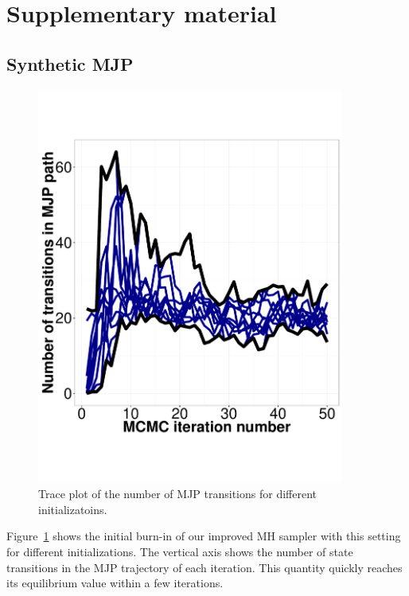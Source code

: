 \section{Supplementary material}

\subsection{Synthetic MJP}

  \begin{figure}[H]
  \centering
  \begin{minipage}[hp]{0.45\linewidth}
  \centering
    \includegraphics [width=0.90\textwidth, angle=0]{figs/exp3_k2_path_transition.pdf}
      \end{minipage}
    \caption{Trace plot of the number of MJP transitions for different initializatoins.}
	\label{fig:Transition_exp}
  \end{figure}

Figure~\ref{fig:Transition_exp} shows the initial burn-in of our improved MH 
sampler with this setting for different initializations. The vertical axis 
shows the number of state transitions in the MJP trajectory of each iteration. 
This quantity quickly reaches its equilibrium value within a few iterations.\\

